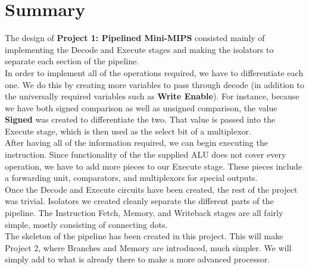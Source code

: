 \documentclass{article}
\begin{document}
\section{Summary}
The design of \textbf{Project 1: Pipelined Mini-MIPS} consisted mainly of implementing the Decode and Execute stages and making the isolators to separate each section of the pipeline.  \\

\noindent In order to implement all of the operations required, we have to differentiate each one. We do this by creating more variables to pass through decode (in addition to the universally required variables such as \textbf{Write Enable}). For instance, because we have both signed comparison as well as unsigned comparison, the value \textbf{Signed} was created to differentiate the two. That value is passed into the Execute stage, which is then used as the select bit of a multiplexor. \\

\noindent After having all of the information required, we can begin executing the instruction. Since functionality of the the supplied ALU does not cover every operation, we have to add more pieces to our Execute stage. These pieces include a forwarding unit, comparators, and multiplexors for special outputs. \\

\noindent Once the Decode and Execute circuits have been created, the rest of the project was trivial. Isolators we created cleanly separate the different parts of the pipeline. The Instruction Fetch, Memory, and Writeback stages are all fairly simple, mostly consisting of connecting dots.\\

\noindent The skeleton of the pipeline has been created in this project. This will make Project 2, where Branches and Memory are introduced, much simpler. We will simply add to what is already there to make a more advanced processor.
\end{document}
